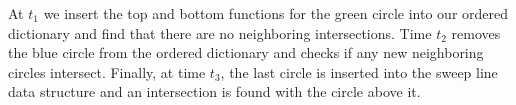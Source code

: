 \documentclass[11pt]{article}
\begin{document}
At $t_1$ we insert the top and bottom functions for the green circle into our ordered dictionary and find that there are no neighboring intersections.
Time $t_2$ removes the blue circle from the ordered dictionary and checks if any new neighboring circles intersect.
Finally, at time $t_3$, the last circle is inserted into the sweep line data structure and an intersection is found with the circle above it.

%
%
\end{document}
